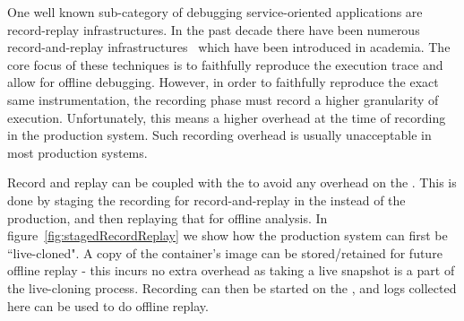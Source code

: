 One well known sub-category of debugging service-oriented applications are record-replay infrastructures.
In the past decade there have been numerous record-and-replay infrastructures~\cite{pres,friday,jockey,mugshot,revirt,r2,laadan2010transparent,mutableReplay} which have been introduced in academia.
The core focus of these techniques is to faithfully reproduce the execution trace and allow for offline debugging.
However, in order to faithfully reproduce the exact same instrumentation, the recording phase must record a higher granularity of execution.
Unfortunately, this means a higher overhead at the time of recording in the production system.
Such recording overhead is usually unacceptable in most production systems.

Record and replay can be coupled with the \debugcontainer to avoid any overhead on the \productioncontainer.
This is done by staging the recording for record-and-replay in the \debugcontainer instead of the production, and then replaying that for offline analysis.
In figure~\ref{fig:stagedRecordReplay} we show how the production system can first be ``live-cloned". A copy of the container's image can be stored/retained for future offline replay - this incurs no extra overhead as taking a live snapshot is a part of the live-cloning process. Recording can then be started on the \debugcontainer, and logs collected here can be used to do offline replay.

